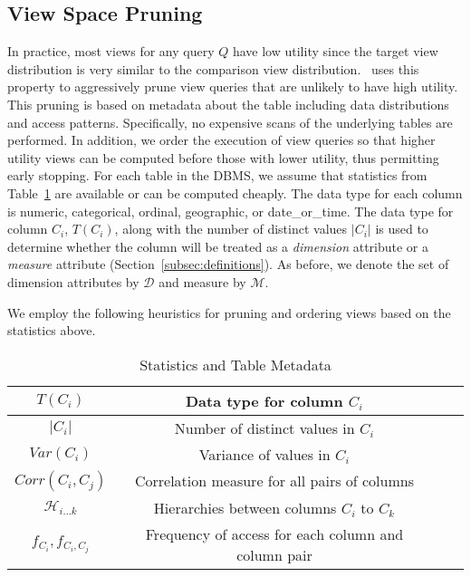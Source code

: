 \subsection{View Space Pruning}
\label{subsubsec:view_space_pruning}

In practice, most views for any query $Q$ have low utility since the target view
distribution is very similar to the comparison view distribution. 
\SeeDB\ uses this property to aggressively prune 
view queries that are unlikely to have high utility. 
This pruning is based on metadata about the table including data
distributions and access patterns. 
Specifically, no expensive scans of the underlying
tables are performed. In addition, we order the execution of view queries so
that higher utility views can be computed before those with lower utility,
thus permitting early stopping. For each table in the DBMS, we assume that
statistics from Table~\ref{tab:statistics} are available or can be computed
cheaply. The data type for each column is numeric, categorical, ordinal, geographic, or
date\_or\_time. The data type for column $C_i$, $T(C_i)$, along with the number
of distinct values $|C_i|$ is used to determine whether the column will be
treated as a {\it dimension} attribute or a {\it measure}
attribute (Section~\ref{subsec:definitions}). As before, we denote the set of
dimension attributes by $\mathcal{D}$ and measure by $\mathcal{M}$.

We employ the following heuristics for pruning and ordering views based on the
statistics above.

\begin{table}
{\scriptsize \center
\vspace{-10pt}
\begin{tabular}{|c|c|c|c|}
\hline
$T(C_i)$ & Data type for column $C_i$ \\ \hline
$|C_i|$ & Number of distinct values in $C_i$ \\
\hline $Var(C_i)$ & Variance of values in $C_i$ \\ \hline
$Corr(C_i, C_j)$ & Correlation measure for all pairs of columns \\ \hline
$\mathcal{H}_{i\ldots k}$ & Hierarchies between columns $C_i$ to $C_k$ \\ \hline
$f_{C_i}, f_{C_i, C_j}$ & Frequency of access for each column and column pair \\
\hline
\end{tabular} 
\vspace{-10pt}
\caption{Statistics and Table Metadata \label{tab:statistics}}
}
\end{table}

